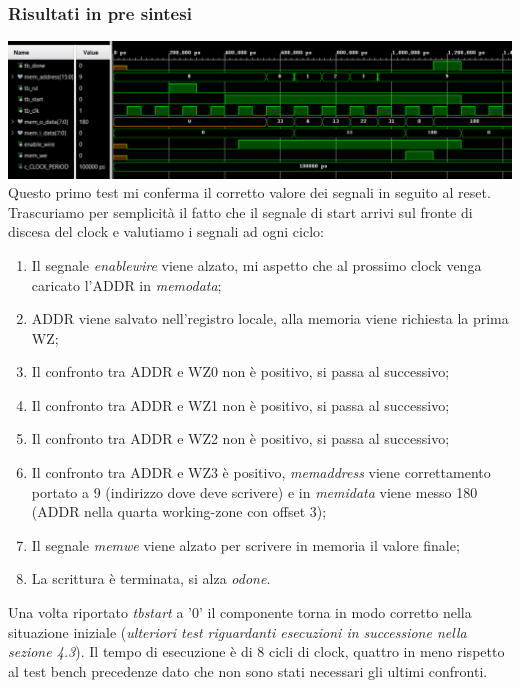 \documentclass{article}
\begin{document}
\subsubsection{Risultati in pre sintesi}
\includegraphics[width=\textwidth]{tb1.png}
Questo primo test mi conferma il corretto valore dei segnali in seguito al reset.
Trascuriamo per semplicità il fatto che il segnale di start arrivi sul fronte di discesa del clock e valutiamo i segnali ad ogni ciclo:
\begin{enumerate}
	\item Il segnale \textit{enable\textunderscore wire} viene alzato, mi aspetto che al prossimo clock venga caricato l'ADDR in \textit{mem\textunderscore o\textunderscore data};
	\item ADDR viene salvato nell'registro locale, alla memoria viene richiesta la prima WZ;
	\item Il confronto tra ADDR e WZ0 non è positivo, si passa al successivo;
	\item Il confronto tra ADDR e WZ1 non è positivo, si passa al successivo;
	\item Il confronto tra ADDR e WZ2 non è positivo, si passa al successivo;
	\item Il confronto tra ADDR e WZ3 è positivo, \textit{mem\textunderscore address} viene correttamento portato a 9 (indirizzo dove deve scrivere) e in \textit{mem\textunderscore i\textunderscore data} viene messo 180 (ADDR nella quarta working-zone con offset 3);
	\item Il segnale \textit{mem\textunderscore we} viene alzato per scrivere in memoria il valore finale;
	\item La scrittura è terminata, si alza \textit{o\textunderscore done}.
\end{enumerate}
Una volta riportato \textit{tb\textunderscore start} a '0' il componente torna in modo corretto nella situazione iniziale (\textit{ulteriori test riguardanti esecuzioni in successione nella sezione 4.3}).
Il tempo di esecuzione è di 8 cicli di clock, quattro in meno rispetto al test bench precedenze dato che non sono stati necessari gli ultimi confronti.
\newpage
\end{document}
